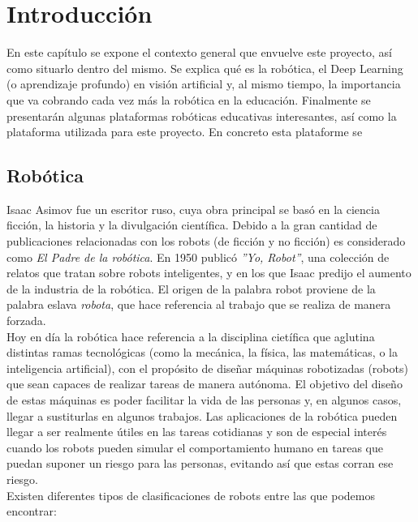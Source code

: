 \documentclass{report}
\begin{document}
\chapter{Introducción}

En este capítulo se expone el contexto general que envuelve este proyecto, así como situarlo dentro del mismo. Se explica qué es la robótica, el Deep Learning (o aprendizaje profundo) en visión artificial y, al mismo tiempo, la importancia que va cobrando cada vez más la robótica en la educación. Finalmente se presentarán algunas plataformas robóticas educativas interesantes, así como la plataforma utilizada para este proyecto. En concreto esta plataforme se 

\section{Robótica}

Isaac Asimov fue un escritor ruso, cuya obra principal se basó en la ciencia ficción, la historia y la divulgación científica. Debido a la gran cantidad de publicaciones relacionadas con los robots (de ficción y no ficción) es considerado como \textit{El Padre de la robótica}. En 1950 publicó \textit{''Yo, Robot''}, una colección de relatos que tratan sobre robots inteligentes, y en los que Isaac predijo el aumento de la industria de la robótica. El origen de la palabra robot proviene de la palabra eslava \textit{robota}, que hace referencia al trabajo que se realiza de manera forzada. 
\\

Hoy en día la robótica hace referencia a la disciplina cietífica que aglutina distintas ramas tecnológicas (como la mecánica, la física, las matemáticas, o la inteligencia artificial), con el propósito de diseñar máquinas robotizadas (robots) que sean capaces de realizar tareas de manera autónoma. El objetivo del diseño de estas máquinas es poder facilitar la vida de las personas y, en algunos casos, llegar a sustiturlas en algunos trabajos. Las aplicaciones de la robótica pueden llegar a ser realmente útiles en las tareas cotidianas y son de especial interés  cuando los robots pueden simular el comportamiento humano en tareas que puedan suponer un riesgo para las personas, evitando así que estas corran ese riesgo.
\\

Existen diferentes tipos de clasificaciones de robots entre las que podemos encontrar:
\end{document}

